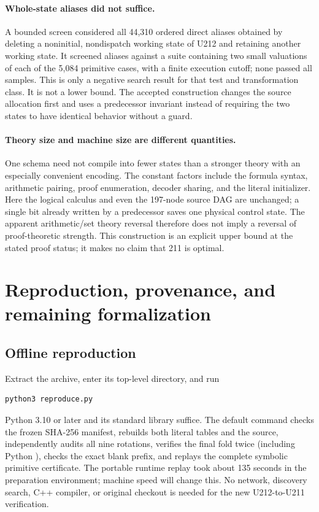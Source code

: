 \paragraph{Whole-state aliases did not suffice.}
A bounded screen considered all 44,310 ordered direct aliases obtained
by deleting a noninitial, nondispatch working state of U212 and retaining
another working state. It screened aliases against a suite containing two
small valuations of each of the 5,084 primitive cases, with a finite execution
cutoff; none passed all samples.
This is only a negative search result for that test and transformation
class. It is not a lower bound. The accepted construction changes the
source allocation first and uses a predecessor invariant instead of
requiring the two states to have identical behavior without a guard.

\paragraph{Theory size and machine size are different quantities.}
One schema need not compile into fewer states than a stronger theory with
an especially convenient encoding. The constant factors include the
formula syntax, arithmetic pairing, proof enumeration, decoder sharing,
and the literal initializer. Here the logical calculus and even the
197-node source DAG are unchanged; a single bit already written by a
predecessor saves one physical control state. The apparent arithmetic/set
theory reversal therefore does not imply a reversal of proof-theoretic
strength. This construction is an explicit upper bound at the stated
proof status; it makes no claim that 211 is optimal.

\section{Reproduction, provenance, and remaining formalization}
\label{sec:reproduction}

\subsection{Offline reproduction}

Extract the archive, enter its top-level directory, and run
\begin{lstlisting}
python3 reproduce.py
\end{lstlisting}
Python 3.10 or later and its standard library suffice. The default command
checks the frozen SHA-256 manifest, rebuilds both literal tables and the
source, independently audits all nine rotations, verifies the final fold
twice (including Python ), checks the exact blank prefix, and
replays the complete symbolic primitive certificate. The portable runtime
replay took about 135 seconds in the preparation environment; machine speed
will change this. No network, discovery search, C++ compiler, or original
checkout is needed for the new U212-to-U211 verification.

